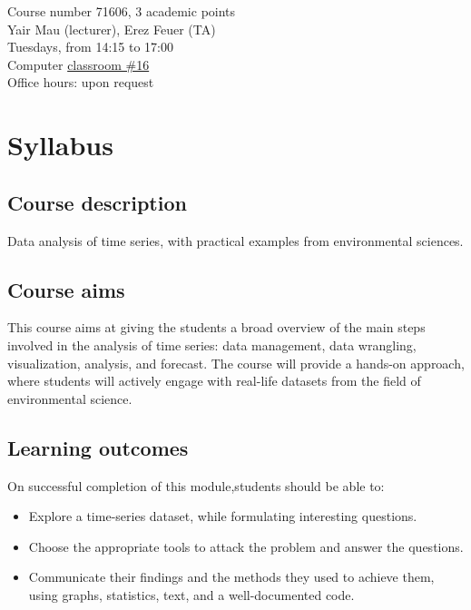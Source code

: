 \documentclass[
  letterpaper,
  DIV=11,
  numbers=noendperiod,
  oneside]{scrreprt}
\providecommand{\tightlist}{%
  \setlength{\itemsep}{0pt}\setlength{\parskip}{0pt}}\usepackage{longtable,booktabs,array}
\begin{document}
Course number 71606, 3 academic points\\
Yair Mau (lecturer), Erez Feuer (TA)\\
Tuesdays, from 14:15 to 17:00\\
Computer \href{https://goo.gl/maps/21CScuxTqJ28Umjw5}{classroom \#16}\\
Office hours: upon request

\hypertarget{syllabus}{%
\section*{Syllabus}\label{syllabus}}


\hypertarget{course-description}{%
\subsection*{Course description}\label{course-description}}

Data analysis of time series, with practical examples from environmental
sciences.

\hypertarget{course-aims}{%
\subsection*{Course aims}\label{course-aims}}

This course aims at giving the students a broad overview of the main
steps involved in the analysis of time series: data management, data
wrangling, visualization, analysis, and forecast. The course will
provide a hands-on approach, where students will actively engage with
real-life datasets from the field of environmental science.

\hypertarget{learning-outcomes}{%
\subsection*{Learning outcomes}\label{learning-outcomes}}

On successful completion of this module,students should be able to:

\begin{itemize}
\tightlist
\item
  Explore a time-series dataset, while formulating interesting
  questions.
\item
  Choose the appropriate tools to attack the problem and answer the
  questions.
\item
  Communicate their findings and the methods they used to achieve them,
  using graphs, statistics, text, and a well-documented code.
\end{itemize}
\end{document}
